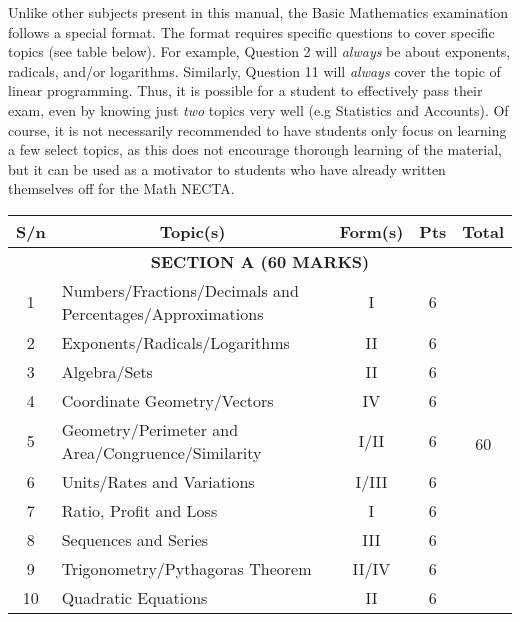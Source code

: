 \noindent Unlike other subjects present in this manual, the Basic Mathematics examination follows a special format. The format requires specific questions to cover specific topics (see table below). For example, Question 2 will \emph{always} be about exponents, radicals, and/or logarithms. Similarly, Question 11 will \emph{always} cover the topic of linear programming. Thus, it is possible for a student to effectively pass their exam, even by knowing just \emph{two} topics very well (e.g Statistics and Accounts). Of course, it is not necessarily recommended to have students only focus on learning a few select topics, as this does not encourage thorough learning of the material, but it can be used as a motivator to students who have already written themselves off for the Math NECTA.

\begin{center}
\begin{tabular}{cl|c|c|c|} \\ \hline
\multicolumn{1}{|c|}{\textbf{S\slash n}} & \multicolumn{1}{c|}{\textbf{Topic(s)}} & \textbf{Form(s)} & \textbf{Pts} & \textbf{Total} \\ \hline \hline
\multicolumn{5}{|c|}{\textbf{SECTION A (60 MARKS)}} \\ \hline
\multicolumn{1}{|c|}{1} & Numbers\slash Fractions\slash Decimals and Percentages\slash Approximations & I & 6 & \multirow{10}{*}{60} \\ \cline{1-4}
\multicolumn{1}{|c|}{2} & Exponents\slash Radicals\slash Logarithms & II & 6 & \\ \cline{1-4}
\multicolumn{1}{|c|}{3} & Algebra\slash Sets & II & 6 & \\ \cline{1-4}
\multicolumn{1}{|c|}{4} & Coordinate Geometry\slash Vectors & IV & 6 & \\ \cline{1-4}
\multicolumn{1}{|c|}{5} & Geometry\slash Perimeter and Area\slash Congruence\slash Similarity & I\slash II & 6 & \\ \cline{1-4}
\multicolumn{1}{|c|}{6} & Units\slash Rates and Variations & I\slash III & 6 & \\ \cline{1-4}
\multicolumn{1}{|c|}{7} & Ratio, Profit and Loss & I & 6 & \\ \cline{1-4}
\multicolumn{1}{|c|}{8} & Sequences and Series & III & 6 & \\ \cline{1-4}
\multicolumn{1}{|c|}{9} & Trigonometry\slash Pythagoras Theorem & II\slash IV & 6 & \\ \cline{1-4}
\multicolumn{1}{|c|}{10} & Quadratic Equations & II & 6 & \\ \hline

\end{tabular}
\end{center}
